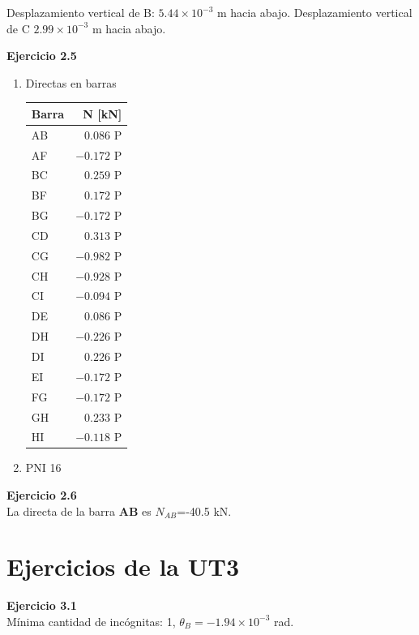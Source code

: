 Desplazamiento vertical de B: $5.44 \times 10^{-3}$ m hacia abajo. Desplazamiento vertical de C $ 2.99 \times 10^{-3}$ m hacia abajo.\newline


\textbf{Ejercicio 2.5}\\

\begin{enumerate}[label=\alph*)]
	\item
Directas en barras

\begin{center}
	\begin{tabular}{lr}
		\hline
		Barra & N [kN] \\
		\hline
AB & $0.086$ P \\
AF & $-0.172$ P \\
BC & $0.259$ P \\
BF & $0.172$ P \\
BG & $-0.172$ P \\
CD & $0.313$ P \\
CG & $-0.982$ P \\
CH & $-0.928$ P \\
CI & $-0.094$ P \\
DE & $0.086$ P \\
DH & $-0.226$ P \\
DI & $0.226$ P \\
EI & $-0.172$ P \\
FG & $-0.172$ P \\
GH & $0.233$ P \\
HI & $-0.118$ P \\
\hline
\end{tabular}
\end{center}

\item PNI 16
\end{enumerate}

\textbf{Ejercicio 2.6}\\

La directa de la barra \textbf{AB} es $N_{AB}$=-40.5 kN.





\section{Ejercicios de la UT3}

\textbf{Ejercicio 3.1}\\
Mínima cantidad de incógnitas: 1, $\theta_B = -1.94 \times 10^{-3}$ rad.

